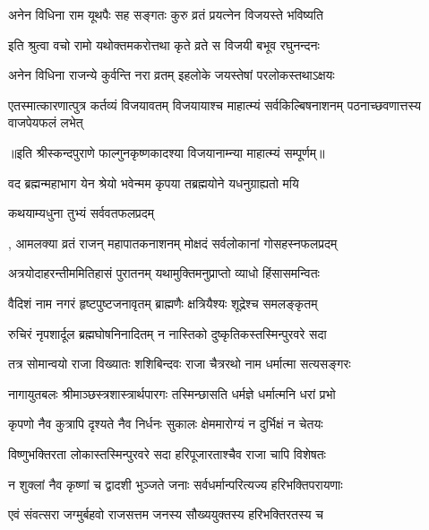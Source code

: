 \twolineshloka
{अनेन विधिना राम यूथपैः सह सङ्गतः}
{कुरु व्रतं प्रयत्नेन विजयस्ते भविष्यति} %

\twolineshloka
{इति श्रुत्वा वचो रामो यथोक्तमकरोत्तथा}
{कृते व्रते स विजयी बभूव रघुनन्दनः} %

\twolineshloka
{अनेन विधिना राजन्ये कुर्वन्ति नरा व्रतम्}
{इहलोके जयस्तेषां परलोकस्तथाऽक्षयः} %


\threelineshloka
{एतस्मात्कारणात्पुत्र कर्तव्यं विजयावतम्}
{विजयायाश्च माहात्म्यं सर्वकिल्बिषनाशनम्}
{पठनाच्छवणात्तस्य वाजपेयफलं लभेत्} %

॥इति श्रीस्कन्दपुराणे फाल्गुनकृष्णकादश्या विजयानाम्न्या माहात्म्यं सम्पूर्णम्॥



\twolineshloka
{वद ब्रह्मन्महाभाग येन श्रेयो भवेन्मम}
{कृपया तब्रह्मयोने यधनुग्राह्यतो मयि} %



\onelineshloka
{कथयाम्यधुना तुभ्यं सर्ववतफलप्रदम्} %

\twolineshloka
{, आमलक्या व्रतं राजन् महापातकनाशनम्}
{मोक्षदं सर्वलोकानां गोसहस्नफलप्रदम्} %

\twolineshloka
{अत्रयोदाहरन्तीममितिहासं पुरातनम्}
{यथामुक्तिमनुप्राप्तो व्याधो हिंसासमन्वितः} %

\twolineshloka
{वैदिशं नाम नगरं हृष्टपुष्टजनावृतम्}
{ब्राह्मणैः क्षत्रियैश्यः शूद्रेश्च समलङ्कृतम्} %

\twolineshloka
{रुचिरं नृपशार्दूल ब्रह्मघोषनिनादितम्}
{न नास्तिको दुष्कृतिकस्तस्मिन्पुरवरे सदा} %

\twolineshloka
{तत्र सोमान्वयो राजा विख्यातः शशिबिन्दवः}
{राजा चैत्ररथो नाम धर्मात्मा सत्यसङ्गरः} %

\twolineshloka
{नागायुतबलः श्रीमाञ्छस्त्रशास्त्रार्थपारगः}
{तस्मिन्छासति धर्मज्ञे धर्मात्मनि धरां प्रभो} %

\twolineshloka
{कृपणो नैव कुत्रापि दृश्यते नैव निर्धनः}
{सुकालः क्षेममारोग्यं न दुर्भिक्षं न चेतयः} %

\twolineshloka
{विष्णुभक्तिरता लोकास्तस्मिन्पुरवरे सदा}
{हरिपूजारताश्चैव राजा चापि विशेषतः} %

\twolineshloka
{न शुक्लां नैव कृष्णां च द्वादशी भुञ्जते जनाः}
{सर्वधर्मान्परित्यज्य हरिभक्तिपरायणाः} %

\twolineshloka
{एवं संवत्सरा जग्मुर्बहवो राजसत्तम}
{जनस्य सौख्ययुक्तस्य हरिभक्तिरतस्य च} %

